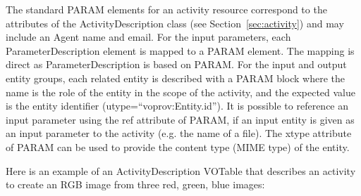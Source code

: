 The standard PARAM elements for an activity resource correspond to the attributes of the ActivityDescription class (see Section~\ref{sec:activity}) and may include an Agent name and email. For the input parameters, each ParameterDescription element is mapped to a PARAM element. The mapping is direct as ParameterDescription is based on PARAM. For the input and output entity groups, each related entity is described with a PARAM block where the name is the role of the entity in the scope of the activity, and the expected value is the entity identifier (utype=``voprov:Entity.id''). It is possible to reference an input parameter using the ref attribute of PARAM, if an input entity is given as an input parameter to the activity (e.g. the name of a file). The xtype attribute of PARAM can be used to provide the content type (MIME type) of the entity.

Here is an example of an ActivityDescription VOTable that describes an activity to create an RGB image from three red, green, blue images:



